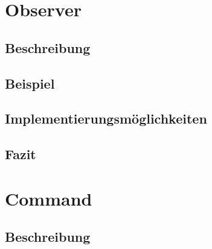 \documentclass[a4paper,11pt]{scrartcl}
\begin{document}


\tableofcontents %
\pagebreak

%

\section{Observer}

\subsection{Beschreibung}

\subsection{Beispiel}

\subsection{Implementierungsmöglichkeiten}

\subsection{Fazit}


\section{Command}

\subsection{Beschreibung}

\end{document}
